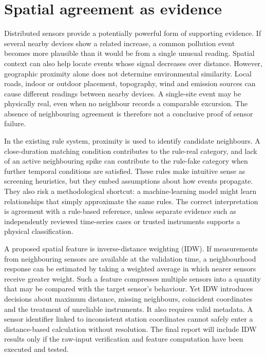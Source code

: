 \documentclass[12pt,a4paper,oneside]{report}
\begin{document}
\section{Spatial agreement as evidence}
Distributed sensors provide a potentially powerful form of supporting evidence. If several nearby devices show a related increase, a common pollution event becomes more plausible than it would be from a single unusual reading. Spatial context can also help locate events whose signal decreases over distance. However, geographic proximity alone does not determine environmental similarity. Local roads, indoor or outdoor placement, topography, wind and emission sources can cause different readings between nearby devices. A single-site event may be physically real, even when no neighbour records a comparable excursion. The absence of neighbouring agreement is therefore not a conclusive proof of sensor failure.

In the existing rule system, proximity is used to identify candidate neighbours. A close-duration matching condition contributes to the rule-real category, and lack of an active neighbouring spike can contribute to the rule-fake category when further temporal conditions are satisfied. These rules make intuitive sense as screening heuristics, but they embed assumptions about how events propagate. They also risk a methodological shortcut: a machine-learning model might learn relationships that simply approximate the same rules. The correct interpretation is agreement with a rule-based reference, unless separate evidence such as independently reviewed time-series cases or trusted instruments supports a physical classification.

A proposed spatial feature is inverse-distance weighting (IDW). If measurements from neighbouring sensors are available at the validation time, a neighbourhood response can be estimated by taking a weighted average in which nearer sensors receive greater weight. Such a feature compresses multiple sensors into a quantity that may be compared with the target sensor's behaviour. Yet IDW introduces decisions about maximum distance, missing neighbours, coincident coordinates and the treatment of unreliable instruments. It also requires valid metadata. A sensor identifier linked to inconsistent station coordinates cannot safely enter a distance-based calculation without resolution. The final report will include IDW results only if the raw-input verification and feature computation have been executed and tested.
\end{document}

